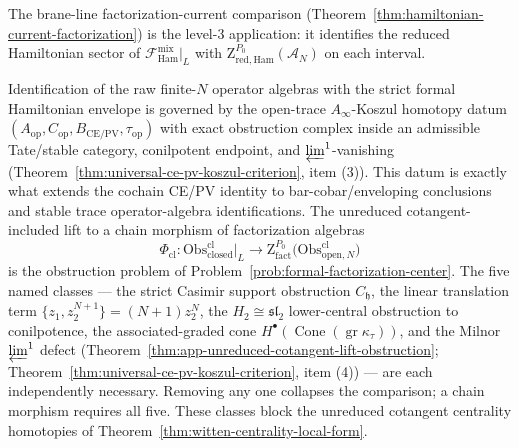 \documentclass[11pt]{memoir}
\begin{document}
The brane-line factorization-current comparison
(Theorem~\ref{thm:hamiltonian-current-factorization}) is the
level-3 application: it identifies the reduced Hamiltonian sector of
\(\mathcal F^{\mathrm{mix}}_{\mathrm{Ham}}\big|_L\) with
\(\mathrm Z^{P_0}_{\mathrm{red,Ham}}(\mathcal A_N)\) on each interval.

Identification of the raw finite-\(N\) operator algebras with the
strict formal Hamiltonian envelope is governed by the open-trace
\(A_\infty\)-Koszul homotopy datum
\((A_{\mathrm{op}},C_{\mathrm{op}},B_{\mathrm{CE/PV}},
\tau_{\mathrm{op}})\) with exact obstruction complex inside an
admissible Tate/stable category, conilpotent endpoint, and
\(\varprojlim^1\)-vanishing
  (Theorem~\ref{thm:universal-ce-pv-koszul-criterion}, item (3)).  This
  datum is exactly what extends the cochain CE/PV identity to
  bar-cobar/enveloping conclusions and stable trace operator-algebra
  identifications.  The unreduced
cotangent-included lift to a chain morphism of factorization algebras
\[
  \Phi_{\mathrm{cl}}\colon
   \mathrm{Obs}^{\mathrm{cl}}_{\mathrm{closed}}\big|_L
   \longrightarrow
   \mathrm Z^{P_0}_{\mathrm{fact}}
   \bigl(\mathrm{Obs}^{\mathrm{cl}}_{\mathrm{open},N}\bigr)
\]
is the obstruction problem of
Problem~\ref{prob:formal-factorization-center}.  The five named
classes --- the strict Casimir support obstruction \(C_{\mathfrak h}\),
the linear translation term \(\{z_1,z_2^{N+1}\}=(N+1)z_2^N\), the
\(H_2\cong\mathfrak{sl}_2\) lower-central obstruction to conilpotence,
the associated-graded cone
\(H^\bullet(\operatorname{Cone}(\operatorname{gr}\kappa_\tau))\), and
the Milnor \(\varprojlim^1\) defect (Theorem~\ref{thm:app-unreduced-cotangent-lift-obstruction};
Theorem~\ref{thm:universal-ce-pv-koszul-criterion}, item (4)) --- are
each independently necessary.  Removing any one collapses the
comparison; a chain morphism requires all five.  These classes block the unreduced
cotangent centrality homotopies of
Theorem~\ref{thm:witten-centrality-local-form}.
\end{document}
